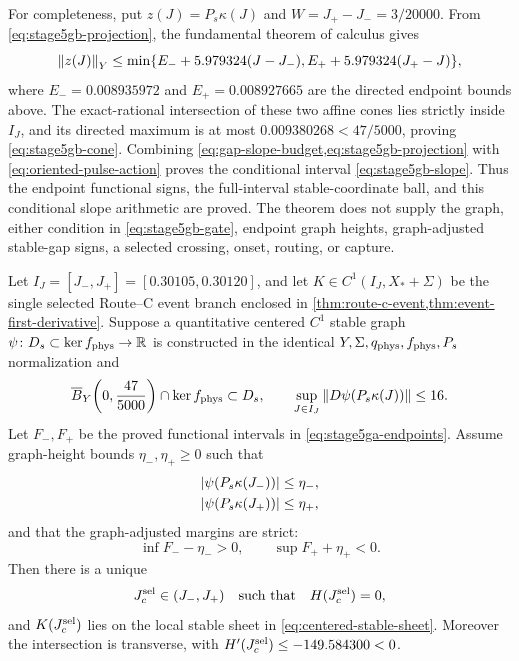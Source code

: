 For completeness, put \(z(J)=P_s\kappa(J)\) and
\(W=J_+-J_-=3/20000\).  From \cref{eq:stage5gb-projection}, the fundamental
theorem of calculus gives
\[
 \left\lVert z(J)\right\rVert_Y\le
 \min\{E_-+5.979324(J-J_-),
        E_++5.979324(J_+-J)\},
\]
where \(E_-=0.008935972\) and \(E_+=0.008927665\) are the directed endpoint
bounds above.  The exact-rational
intersection of these two affine cones lies strictly inside \(I_J\), and its
directed maximum is at most
\(0.009380268<47/5000\), proving \cref{eq:stage5gb-cone}.  Combining
\cref{eq:gap-slope-budget,eq:stage5gb-projection} with
\cref{eq:oriented-pulse-action} proves the conditional interval
\cref{eq:stage5gb-slope}.  Thus the endpoint functional signs, the
full-interval stable-coordinate ball, and this conditional slope arithmetic
are proved.  The theorem does not supply the graph, either condition in
\cref{eq:stage5gb-gate}, endpoint graph heights, graph-adjusted stable-gap
signs, a selected crossing, onset, routing, or capture.

\begin{proposition}
\label{prop:selected-center-crossing}
Let \(I_J=[J_-,J_+]=[0.30105,0.30120]\), and let
\(K\in C^1(I_J,X_*+\Sigma)\) be the single selected Route--C event branch enclosed in
\cref{thm:route-c-event,thm:event-first-derivative}.  Suppose a quantitative
centered \(C^1\) stable graph
\(\psi\colon D_s\subset\ker f_{\rm phys}\to\mathbb R\) is constructed in the identical
\(Y,\Sigma,q_{\rm phys},f_{\rm phys},P_s\) normalization and
\begin{equation}
 \overline B_Y\!\left(0,\frac{47}{5000}\right)
       \cap\ker f_{\rm phys}\subset D_s,
 \qquad
 \sup_{J\in I_J}\left\lVert D\psi(P_s\kappa(J))\right\rVert\le16.     \label{eq:center-crossing-graph-data}
\end{equation}
Let \(F_-,F_+\) be the proved functional intervals in
\cref{eq:stage5ga-endpoints}.  Assume graph-height bounds
\(\eta_-,\eta_+\ge0\) such that
\begin{equation}
 \begin{aligned}
 \left\lvert\psi(P_s\kappa(J_-))\right\rvert&\le\eta_-,\\
 \left\lvert\psi(P_s\kappa(J_+))\right\rvert&\le\eta_+,
 \end{aligned}                                        \label{eq:center-crossing-endpoint-data}
\end{equation}
and that the graph-adjusted margins are strict:
\begin{equation}
 \inf F_- -\eta_->0,
 \qquad
 \sup F_+ +\eta_+<0.                                  \label{eq:center-crossing-margins}
\end{equation}
Then there is a unique
\begin{equation}
 J_c^{\rm sel}\in(J_-,J_+)
 \quad\text{such that}\quad
 H(J_c^{\rm sel})=0,                                  \label{eq:selected-center-root}
\end{equation}
and \(K(J_c^{\rm sel})\) lies on the local stable sheet in
\cref{eq:centered-stable-sheet}.  Moreover the intersection is transverse,
with \(H'(J_c^{\rm sel})\le-149.584300<0\).
\end{proposition}

